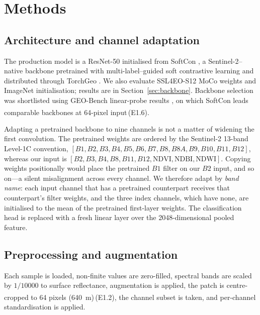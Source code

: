 \documentclass[11pt,a4paper]{article}
\newcommand{\unablated}[1]{\textsuperscript{\dag}\,(#1)}
\begin{document}
\section{Methods}
\label{sec:methods}

\subsection{Architecture and channel adaptation}
\label{sec:arch}

The production model is a ResNet-50 \citep{he2016resnet} initialised from
SoftCon \citep{wang2024softcon}, a Sentinel-2--native backbone pretrained with
multi-label--guided soft contrastive learning and distributed through TorchGeo
\citep{stewart2022torchgeo}. We also evaluate SSL4EO-S12 MoCo weights
\citep{wang2023ssl4eo,he2020moco} and ImageNet initialisation; results are in
Section~\ref{sec:backbone}. Backbone selection was shortlisted using GEO-Bench
linear-probe results \citep{lacoste2023geobench}, on which SoftCon leads
comparable backbones at 64-pixel input\unablated{E1.6}.

Adapting a pretrained backbone to nine channels is not a matter of widening the
first convolution. The pretrained weights are ordered by the Sentinel-2 13-band
Level-1C convention, \([B1, B2, B3, B4, B5, B6, B7, B8, B8A, B9, B10, B11, B12]\),
whereas our input is \([B2, B3, B4, B8, B11, B12, \mathrm{NDVI}, \mathrm{NDBI},
\mathrm{NDWI}]\). Copying weights positionally would place the pretrained
\(B1\) filter on our \(B2\) input, and so on---a silent misalignment across every
channel. We therefore adapt by \emph{band name}: each input channel that has a
pretrained counterpart receives that counterpart's filter weights, and the three
index channels, which have none, are initialised to the mean of the pretrained
first-layer weights. The classification head is replaced with a fresh linear
layer over the 2048-dimensional pooled feature.

\subsection{Preprocessing and augmentation}

Each sample is loaded, non-finite values are zero-filled, spectral bands are
scaled by \(1/10000\) to surface reflectance, augmentation is applied, the patch
is centre-cropped to 64 pixels (\SI{640}{\metre})\unablated{E1.2}, the channel
subset is taken, and per-channel standardisation is applied.
\end{document}
